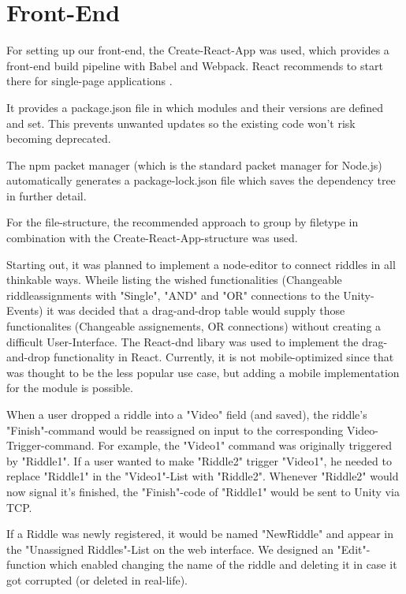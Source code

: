 \section{Front-End}
For setting up our front-end, the Create-React-App was used, which provides a front-end build pipeline with Babel and Webpack.
React recommends to start there for single-page applications \parencite{createReactApp}.

It provides a package.json file in which modules and their versions are defined and set.
This prevents unwanted updates so the existing code won't risk becoming deprecated.

The npm packet manager (which is the standard packet manager for Node.js) automatically generates a package-lock.json file which saves the dependency tree in further detail.

For the file-structure, the recommended approach to group by filetype \parencite{reactStructure} in combination with the Create-React-App-structure was used.

Starting out, it was planned to implement a node-editor to connect riddles in all thinkable ways.
Wheile listing the wished functionalities (Changeable riddleassignments with "Single", "AND" and "OR" connections to the Unity-Events) it was decided that a drag-and-drop table would supply those functionalites (Changeable assignements, OR connections) without creating a difficult User-Interface.
The React-dnd libary \parencite{reactDND} was used to implement the drag-and-drop functionality in React. 
Currently, it is not mobile-optimized since that was thought to be the less popular use case, but adding a mobile implementation for the module is possible.

When a user dropped a riddle into a "Video" field (and saved), the riddle's "Finish"-command would be reassigned on input to the corresponding Video-Trigger-command.
For example, the "Video1" command was originally triggered by "Riddle1".
If a user wanted to make "Riddle2" trigger "Video1", he needed to replace "Riddle1" in the "Video1"-List with "Riddle2".
Whenever "Riddle2" would now signal it's finished, the "Finish"-code of "Riddle1" would be sent to Unity via TCP.

If a Riddle was newly registered, it would be named "NewRiddle" and appear in the "Unassigned Riddles"-List on the web interface.
We designed an "Edit"-function which enabled changing the name of the riddle and deleting it in case it got corrupted (or deleted in real-life).


